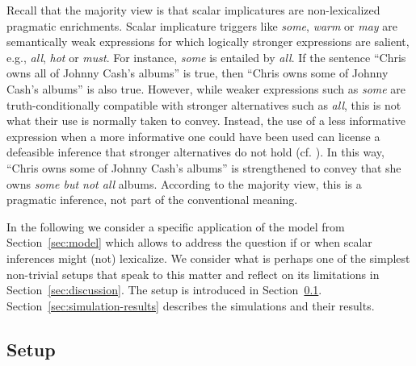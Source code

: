 \documentclass[a4paper, 11pt]{article}
\theoremstyle{Satz}
\begin{document}
Recall that the majority view is that scalar implicatures are non-lexicalized pragmatic
enrichments. Scalar implicature triggers like \emph{some}, \emph{warm} or \emph{may} are
semantically weak expressions for which logically stronger expressions are salient, e.g.,
\emph{all}, \emph{hot} or \emph{must}. For instance, {\em some} is entailed by {\em all}. If
the sentence ``Chris owns all of Johnny Cash's albums'' is true, then ``Chris owns some of
Johnny Cash's albums'' is also true. However, while weaker expressions such as {\em some} are
truth-conditionally compatible with stronger alternatives such as {\em all}, this is not what
their use is normally taken to convey. Instead, the use of a less informative expression when a
more informative one could have been used can license a defeasible inference that stronger
alternatives do not hold (cf. \citealt{horn:1972,gazdar:1979}). In this way, ``Chris owns some
of Johnny Cash's albums'' is strengthened to convey that she owns {\em some but not all}
albums. According to the majority view, this is a pragmatic inference, not part of the
conventional meaning.

In the following we consider a specific application of the model from Section~\ref{sec:model}
which allows to address the question if or when scalar inferences might (not) lexicalize. We
consider what is perhaps one of the simplest non-trivial setups that speak to this matter and
reflect on its limitations in Section~\ref{sec:discussion}. The setup is introduced in
Section~\ref{sec:setup:-stat-conc}. Section~\ref{sec:simulation-results} describes the simulations
and their results.



\subsection{Setup}
\label{sec:setup:-stat-conc}
\end{document}
